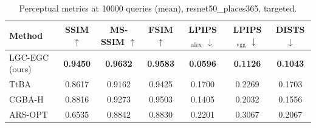 \begin{table}[t]
\centering\footnotesize
\caption{Perceptual metrics at 10000 queries (mean), resnet50\_places365, targeted.}
\begin{tabular}{lcccccc}
\toprule
Method & SSIM $\uparrow$ & MS-SSIM $\uparrow$ & FSIM $\uparrow$ & LPIPS$_{\mathrm{alex}}$ $\downarrow$ & LPIPS$_{\mathrm{vgg}}$ $\downarrow$ & DISTS $\downarrow$ \\
\midrule
LGC-EGC (ours) & \textbf{0.9450} & \textbf{0.9632} & \textbf{0.9583} & \textbf{0.0596} & \textbf{0.1126} & \textbf{0.1043} \\
TtBA & 0.8617 & 0.9162 & 0.9425 & 0.1700 & 0.2269 & 0.1703 \\
CGBA-H & 0.8816 & 0.9273 & 0.9503 & 0.1405 & 0.2032 & 0.1556 \\
ARS-OPT & 0.6535 & 0.8842 & 0.8830 & 0.2201 & 0.3067 & 0.2067 \\
\bottomrule
\end{tabular}
\end{table}
